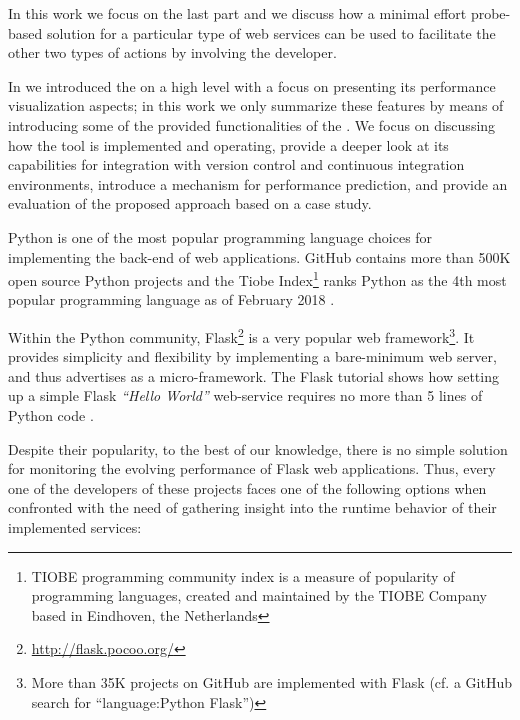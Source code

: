 \documentclass[conference]{IEEEtran}
\begin{document}
In this work we focus on the last part and we discuss how a minimal effort probe-based solution for a particular type of web services can be used to facilitate the other two types of actions by involving the developer.

In \cite{vogel2017low} we introduced the \tool on a high level with a focus on presenting its performance visualization aspects; in this work we only summarize these features by means of introducing some of the provided functionalities of the \tool. We focus on discussing how the tool is implemented and operating, provide a deeper look at its capabilities for integration with version control and continuous integration environments, introduce a mechanism for performance prediction, and provide an evaluation of the proposed approach based on a case study.



Python is one of the most popular programming language choices for implementing the back-end of web applications. GitHub contains more than 500K open source Python projects and the Tiobe Index\footnote{TIOBE programming community index is a measure of popularity of programming languages, created and maintained by the TIOBE Company based in Eindhoven, the Netherlands} ranks Python as the 4th most popular programming language as of February 2018 \cite{tiobe}.
 
Within the Python community, Flask\footnote{\url{http://flask.pocoo.org/}} is a very popular web framework\footnote{More than 35K projects on GitHub are implemented with Flask (cf. a GitHub search for ``language:Python Flask'')}. It provides simplicity and flexibility by implementing a bare-minimum web server, and thus advertises as a micro-framework. The Flask tutorial shows how setting up a simple Flask {\em ``Hello World''} web-service requires no more than 5 lines of Python code \cite{ flask:tutorial}.
 
Despite their popularity, to the best of our knowledge, there is no simple solution for monitoring the evolving performance of Flask web applications. Thus, every one of the developers of these projects faces one of the following options when confronted with the need of gathering insight into the runtime behavior of their implemented services: 
\end{document}
